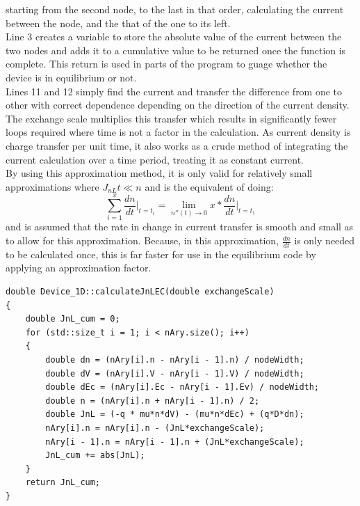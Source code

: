 \documentclass[titlepage]{article}
\begin{document}
starting from the second node, to the last in that order, calculating the current between the node, and the that of the one to its left.\\
Line 3 creates a variable to store the absolute value of the current between the two nodes and adds it to a cumulative value to be returned once the function is complete. This return is used in parts of the program to guage whether the device is in equilibrium or not.\\
Lines 11 and 12 simply find the current and transfer the difference from one to other with correct dependence depending on the direction of the current density.\\
The exchange scale multiplies this transfer which results in significantly fewer loops required where time is not a factor in the calculation. As current density is charge transfer per unit time, it also works as a crude method of integrating the current calculation over a time period, treating it as constant current.\\
By using this approximation method, it is only valid for relatively small approximations where $J_{nL} t \ll n$ and is the equivalent of doing:
\begin{equation}
 \sum\limits_{i=1}^{x}\dfrac{dn}{dt}\Big|_{t=t_i} = \lim\limits_{n''(t)\to 0} x* \dfrac{dn}{dt}\Big|_{t=t_1}  
\end{equation}
and is assumed that the rate in change in current transfer is smooth and small as to allow for this approximation. Because, in this approximation, $\frac{dn}{dt}$ is only needed to be calculated once, this is far faster for use in the equilibrium code by applying an approximation factor.
\begin{lstlisting}[caption = Example of the current calculation algorithm]
double Device_1D::calculateJnLEC(double exchangeScale)
{
	double JnL_cum = 0;	
	for (std::size_t i = 1; i < nAry.size(); i++)
	{
		double dn = (nAry[i].n - nAry[i - 1].n) / nodeWidth;
		double dV = (nAry[i].V - nAry[i - 1].V) / nodeWidth;
		double dEc = (nAry[i].Ec - nAry[i - 1].Ev) / nodeWidth;
		double n = (nAry[i].n + nAry[i - 1].n) / 2;
		double JnL = (-q * mu*n*dV) - (mu*n*dEc) + (q*D*dn);
		nAry[i].n = nAry[i].n - (JnL*exchangeScale);
		nAry[i - 1].n = nAry[i - 1].n + (JnL*exchangeScale);
		JnL_cum += abs(JnL);
	}
	return JnL_cum;
}
\end{lstlisting}
\end{document}
